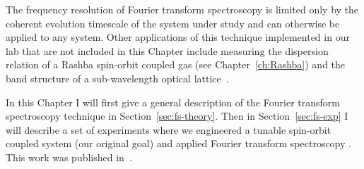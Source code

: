 The frequency resolution of Fourier transform spectroscopy is limited only by the coherent evolution timescale of the system under study and can otherwise be applied to any system. Other applications of this technique implemented in our lab that are not included in this Chapter include measuring the dispersion relation of a Rashba spin-orbit coupled gas (see Chapter~\ref{ch:Rashba}) and the band structure of a sub-wavelength optical lattice~\cite{anderson_realization_2019}.

In this Chapter I will first give a general description of the Fourier transform spectroscopy technique in Section~\ref{sec:fs-theory}. Then in Section~\ref{sec:fs-exp} I will describe a set of experiments where we engineered a tunable spin-orbit coupled system (our original goal) and applied Fourier transform spectroscopy . This work was published in~\cite{valdes-curiel_fourier_2017}.


